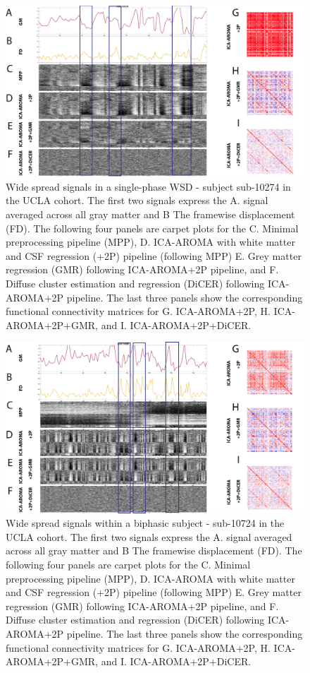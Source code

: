 \documentclass[oneside]{zHenriquesLab-StyleBioRxiv}
\begin{document}
\begin{figure}[ht!]
\includegraphics[width=1\textwidth]{figs/figure_example.png}
\caption{Wide spread signals in a single-phase WSD - subject sub-10274 in the UCLA cohort. The first two signals express the A. signal averaged across all gray matter and B The framewise displacement (FD). The following four panels are carpet plots for the C. Minimal preprocessing pipeline (MPP), D. ICA-AROMA with white matter and CSF regression (+2P) pipeline (following MPP) E. Grey matter regression (GMR) following ICA-AROMA+2P pipeline, and F. Diffuse cluster estimation and regression (DiCER) following ICA-AROMA+2P pipeline. The last three panels show the corresponding functional connectivity matrices for G. ICA-AROMA+2P, H. ICA-AROMA+2P+GMR, and I. ICA-AROMA+2P+DiCER. }\label{fig:rsfMRIexp}
\end{figure}

\begin{figure}[ht!]
\includegraphics[width=1\textwidth]{figs/figure_example2.png}
\caption{Wide spread signals within a biphasic subject - sub-10724 in the UCLA cohort. The first two signals express the A. signal averaged across all gray matter and B The framewise displacement (FD). The following four panels are carpet plots for the C. Minimal preprocessing pipeline (MPP), D. ICA-AROMA with white matter and CSF regression (+2P) pipeline (following MPP) E. Grey matter regression (GMR) following ICA-AROMA+2P pipeline, and F. Diffuse cluster estimation and regression (DiCER) following ICA-AROMA+2P pipeline. The last three panels show the corresponding functional connectivity matrices for G. ICA-AROMA+2P, H. ICA-AROMA+2P+GMR, and I. ICA-AROMA+2P+DiCER. }\label{fig:rsfMRIexpbiphasic}
\end{figure}
\end{document}
